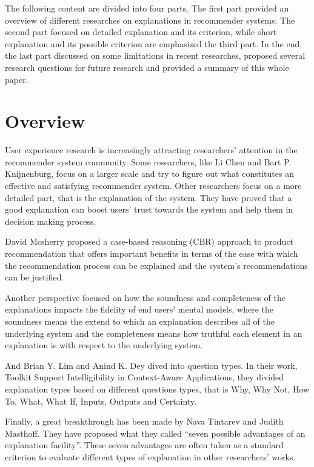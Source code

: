   The following content are divided into four parts. The first part provided an overview of different researches on explanations in recommender systems. 
  The second part focused on detailed explanation and its criterion, while short explanation and its possible criterion are emphasized the third part.
  In the end, the last part discussed on some limitations in recent researches, proposed several research questions for future research and provided
  a summary of this whole paper.

\section{Overview}

    \indent 
    User experience research is increasingly attracting researchers’ attention in the recommender system community. 
    Some researchers, like Li Chen\cite{pu2011user} and Bart P. Knijnenburg\cite{knijnenburg2012explaining}, focus on a larger scale and try to figure out what constitutes an effective and satisfying recommender system.
    Other researchers focus on a more detailed part, that is the explanation of the system. They have proved that
    a good explanation can boost users' trust towards the system and help them in decision making process\cite{tintarev2007survey}\cite{van2004designing}\cite{pu2007trust}.

    \indent David Mcsherry proposed a case-based reasoning (CBR) approach\cite{mcsherry2005explanation} to product recommendation
    that offers important benefits in terms of the ease with which the recommendation process can be explained and the system\rq s recommendations can be justified.

    \indent Another perspective focused on how the soundness and completeness of the explanations impacts the fidelity of end users' mental models\cite{kulesza2013too},
    where the soundness means the extend to which an explanation describes all of the underlying system
    and the completeness means how truthful each element in an explanation is with respect to the underlying system.

    \indent And Brian Y. Lim and Anind K. Dey dived into question types. In their work, Toolkit Support Intelligibility in Context-Aware Applications\cite{lim2010toolkit}, they
    divided explanation types based on different questions types, that is Why, Why Not, How To, What, What If, Inputs, Outputs and Certainty.
    
    \indent Finally, a great breakthrough has been made by Nava Tintarev and Judith Masthoff.
    They have proposed what they called ``seven possible advantages of an explanation facility''\cite{tintarev2007survey}.
    These seven advantages are often taken as a standard criterion to evaluate different types of explanation in other researchers' works.

